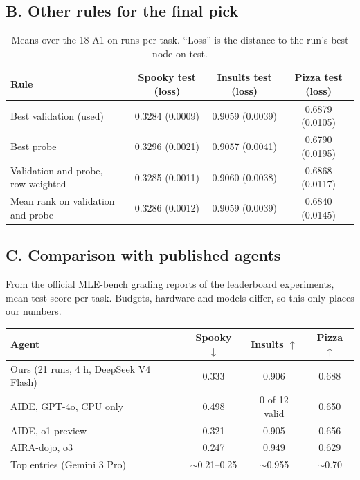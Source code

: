 \documentclass[11pt]{article}
\begin{document}
\subsection*{B. Other rules for the final pick}

\begin{table}[H]
\centering
\small
\begin{tabular}{@{}lccc@{}}
\toprule
\textbf{Rule} & \textbf{Spooky test (loss)} & \textbf{Insults test (loss)}
& \textbf{Pizza test (loss)} \\
\midrule
Best validation (used) & 0.3284 (0.0009) & 0.9059 (0.0039) & 0.6879 (0.0105) \\
Best probe & 0.3296 (0.0021) & 0.9057 (0.0041) & 0.6790 (0.0195) \\
Validation and probe, row-weighted & 0.3285 (0.0011) & 0.9060 (0.0038) & 0.6868 (0.0117) \\
Mean rank on validation and probe & 0.3286 (0.0012) & 0.9059 (0.0039) & 0.6840 (0.0145) \\
\bottomrule
\end{tabular}
\caption{Means over the 18 A1-on runs per task. ``Loss'' is the distance to the run's
best node on test.}
\end{table}

\subsection*{C. Comparison with published agents}
\label{app:compare}

From the official MLE-bench grading reports of the leaderboard experiments, mean test
score per task. Budgets, hardware and models differ, so this only places our numbers.

\begin{table}[H]
\centering
\small
\begin{tabular}{@{}lccc@{}}
\toprule
\textbf{Agent} & \textbf{Spooky} $\downarrow$ & \textbf{Insults} $\uparrow$
& \textbf{Pizza} $\uparrow$ \\
\midrule
Ours (21 runs, 4 h, DeepSeek V4 Flash) & 0.333 & 0.906 & 0.688 \\
AIDE, GPT-4o, CPU only & 0.498 & 0 of 12 valid & 0.650 \\
AIDE, o1-preview & 0.321 & 0.905 & 0.656 \\
AIRA-dojo, o3 & 0.247 & 0.949 & 0.629 \\
Top entries (Gemini 3 Pro) & $\sim$0.21--0.25 & $\sim$0.955 & $\sim$0.70 \\
\bottomrule
\end{tabular}
\end{table}
\end{document}
